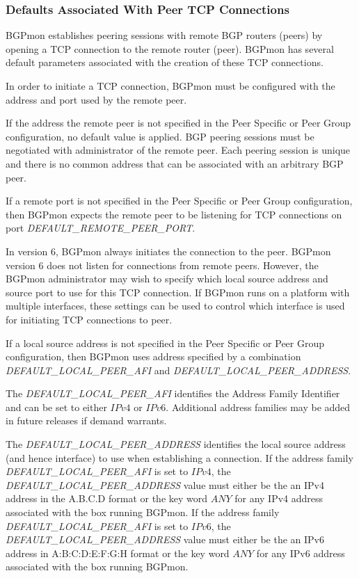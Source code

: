 \subsubsection{Defaults Associated With Peer TCP Connections}

BGPmon establishes peering sessions with remote BGP routers (peers) by opening a TCP connection to the remote router (peer).    BGPmon has several default parameters associated with the creation of these TCP connections.  

In order to initiate a TCP connection,  BGPmon must be configured with the address and port used by the remote peer.  

If the address the remote peer is not specified in the Peer Specific or Peer Group configuration, no default value is applied.   BGP peering sessions must be negotiated with administrator of the remote peer.    Each peering session is unique and there is no common address that can be associated with an arbitrary BGP peer.

If a remote port is not specified in the Peer Specific or Peer Group configuration,  then BGPmon expects the remote peer to be listening for TCP connections on port  \emph{DEFAULT\_REMOTE\_PEER\_PORT}.   

In version 6,  BGPmon always initiates the connection to the peer.   BGPmon version 6 does not listen for connections from remote peers.   However, the BGPmon administrator  may wish to specify which local source address and source port to use for this TCP connection.   If BGPmon runs on a platform with multiple interfaces, these settings can be used to control which interface is used for initiating TCP connections to peer.    

If a local source address is not specified in the Peer Specific or Peer Group configuration,  then BGPmon uses address specified by a combination \emph{DEFAULT\_LOCAL\_PEER\_AFI} and \emph{DEFAULT\_LOCAL\_PEER\_ADDRESS}.    

The \emph{DEFAULT\_LOCAL\_PEER\_AFI} identifies the Address Family Identifier and can be set to either $IPv4$ or $IPv6$.   Additional address families may be added in future releases if demand warrants.   

The \emph{DEFAULT\_LOCAL\_PEER\_ADDRESS} identifies the local source address (and hence interface) to use when establishing a connection.   If the address family \emph{DEFAULT\_LOCAL\_PEER\_AFI}  is set to $IPv4$,  the  \emph{DEFAULT\_LOCAL\_PEER\_ADDRESS} value must either be the an IPv4 address in the A.B.C.D format or the key word $ANY$ for any IPv4 address associated with the box running BGPmon.  If the address family \emph{DEFAULT\_LOCAL\_PEER\_AFI}  is set to $IPv6$,  the  \emph{DEFAULT\_LOCAL\_PEER\_ADDRESS} value must either be the an IPv6 address in A:B:C:D:E:F:G:H format or the key word $ANY$ for any IPv6 address associated with the box running BGPmon.   

